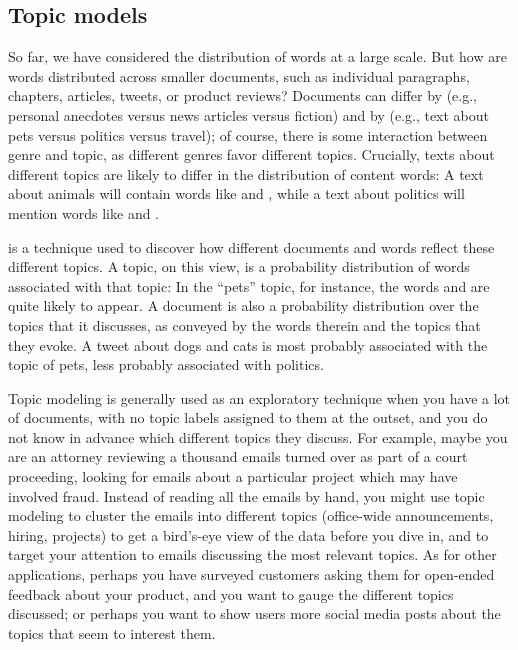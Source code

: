 \subsection{Topic models}

So far, we have considered the distribution of words at a large scale.
But how are words distributed across smaller documents, such as
individual paragraphs, chapters, articles, tweets, or product reviews?
Documents can differ by  (e.g., personal anecdotes
versus news articles versus fiction) and by  (e.g.,
text about pets versus politics versus travel); of course, there
is some interaction between genre and topic, as different genres favor
different topics. Crucially, texts about different topics are likely
to differ in the distribution of content words: A text about animals will contain words like  and , while a text about politics will mention
words like  and .

 is a technique used to discover how different
documents and words reflect these different topics.  A topic, on this view, is a probability distribution
of words associated with that topic: In the ``pets'' topic, for
instance, the words  and  are quite likely to appear.
A document is also a probability distribution over the topics
that it discusses, as conveyed by the words therein and the topics
that they evoke.  A tweet about dogs and cats is most probably
associated with the topic of pets, less probably associated with
politics.

Topic modeling is generally used as an exploratory technique when you
have a lot of documents, with no topic labels assigned to them at the
outset, and you do not know in advance which different topics they
discuss.  For example, maybe you are an attorney reviewing a thousand
emails turned over as part of a court proceeding, looking for emails
about a particular project which may have involved fraud.  Instead of
reading all the emails by hand, you might use topic modeling to
cluster the emails into different topics (office-wide announcements,
hiring, projects) to get a bird's-eye view of the data before you dive
in, and to target your attention to emails discussing the most
relevant topics.   As for other applications, perhaps you have surveyed customers asking them
for open-ended feedback about your product, and you want to gauge the
different topics discussed; or perhaps you want to show users more social media posts about the topics that seem to interest them.

